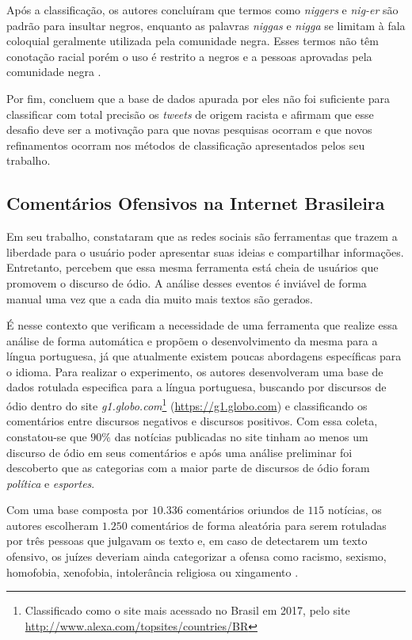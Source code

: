 Após a classificação, os autores concluíram que termos como \textit{niggers} e \textit{nig-er} são padrão para insultar negros, enquanto as palavras \textit{niggas} e \textit{nigga} se limitam à fala coloquial geralmente utilizada pela comunidade negra. Esses termos não têm conotação racial porém o uso é restrito a negros e a pessoas aprovadas pela comunidade negra \cite{kwok2013locate}.

Por fim,  concluem que a base de dados apurada por eles não foi suficiente para classificar com total precisão os \textit{tweets} de origem racista e afirmam que esse desafio deve ser a motivação para que novas pesquisas ocorram e que novos refinamentos ocorram nos métodos de classificação apresentados pelos seu trabalho.

\subsection{Comentários Ofensivos na Internet Brasileira}

Em seu trabalho,  constataram que as redes sociais são ferramentas que trazem a liberdade para o usuário poder apresentar suas ideias e compartilhar informações. Entretanto, percebem que essa mesma ferramenta está cheia de usuários que promovem o discurso de ódio. A análise desses eventos é inviável de forma manual uma vez que a cada dia muito mais textos são gerados.

É nesse contexto que  verificam a necessidade de uma ferramenta que realize essa análise de forma automática e propõem o desenvolvimento da mesma para a língua portuguesa, já que atualmente existem poucas abordagens específicas para o idioma. Para realizar o experimento, os autores desenvolveram uma base de dados rotulada especifica para a língua portuguesa, buscando por discursos de ódio dentro do site \textit{g1.globo.com}\footnote{ Classificado como o site mais acessado no Brasil em 2017, pelo site  \url{http://www.alexa.com/topsites/countries/BR}} (\url{https://g1.globo.com}) e classificando os comentários entre discursos negativos e discursos positivos. Com essa coleta, constatou-se que $90\%$ das notícias publicadas no site tinham ao menos um discurso de ódio em seus comentários e após uma análise preliminar foi descoberto que as categorias com a maior parte de discursos de ódio foram \textit{política} e \textit{esportes}.

Com uma base composta por $10.336$ comentários oriundos de $115$ notícias, os autores escolheram $1.250$ comentários de forma aleatória para serem rotuladas por três pessoas que julgavam os texto e, em caso de detectarem um texto ofensivo, os juízes deveriam ainda categorizar a ofensa como racismo, sexismo, homofobia, xenofobia, intolerância religiosa ou xingamento \cite{Pelle2017}. 


